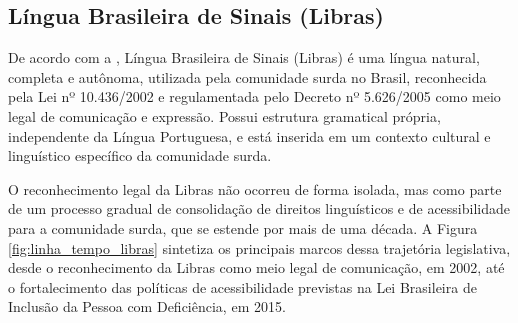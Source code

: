 \documentclass[
    12pt,                %
    openright,           %
    oneside,             %
    a4paper,             %
    english,             %
    brazil               %
]{abntex2}
\begin{document}
\subsection{Língua Brasileira de Sinais (Libras)}

De acordo com a , Língua Brasileira de Sinais (Libras) é uma língua natural, completa e autônoma, utilizada pela comunidade surda no Brasil, reconhecida pela Lei nº 10.436/2002 e regulamentada pelo Decreto nº 5.626/2005 como meio legal de comunicação e expressão. Possui estrutura gramatical própria, independente da Língua Portuguesa, e está inserida em um contexto cultural e linguístico específico da comunidade surda.

O reconhecimento legal da Libras não ocorreu de forma isolada, mas como parte de um processo gradual de consolidação de direitos linguísticos e de acessibilidade para a comunidade surda, que se estende por mais de uma década. A Figura \ref{fig:linha_tempo_libras} sintetiza os principais marcos dessa trajetória legislativa, desde o reconhecimento da Libras como meio legal de comunicação, em 2002, até o fortalecimento das políticas de acessibilidade previstas na Lei Brasileira de Inclusão da Pessoa com Deficiência, em 2015.
 
\end{document}
